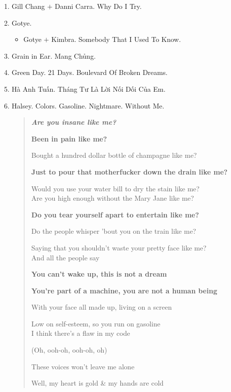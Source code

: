 \documentclass{article}
\begin{document}
\begin{enumerate}
	\item {\sc Gill Chang $+$ Danni Carra.} Why Do I Try.
	\item {\sc Gotye.}
	\begin{itemize}
		\item {\sc Gotye $+$ Kimbra.} Somebody That I Used To Know.
	\end{itemize}
	\item {\sc Grain in Ear.} Mang Chủng.
	\item {\sc Green Day.} 21 Days. Boulevard Of Broken Dreams.
	\item {\sc Hà Anh Tuấn.} Tháng Tư Là Lời Nối Dối Của Em.
	\item {\sc Halsey.} Colors. Gasoline. Nightmare. Without Me.

	\begin{quotation}\it
		\textbf{Are you insane like me?}

		\textbf{Been in pain like me?}

		Bought a hundred dollar bottle of champagne like me?

		\textbf{Just to pour that motherfucker down the drain like me?}

		Would you use your water bill to dry the stain like me?
		\\

		Are you high enough without the Mary Jane like me?

		\textbf{Do you tear yourself apart to entertain like me?}

		Do the people whisper 'bout you on the train like me?

		Saying that you shouldn't waste your pretty face like me?
		\\

		And all the people say

		\textbf{You can't wake up, this is not a dream}

		\textbf{You're part of a machine, you are not a human being}

		With your face all made up, living on a screen

		Low on self-esteem, so you run on gasoline
		\\

		I think there's a flaw in my code

		(Oh, ooh-oh, ooh-oh, oh)

		These voices won't leave me alone

		Well, my heart is gold \& my hands are cold
		\\


\end{quotation}
\end{enumerate}
\end{document}

